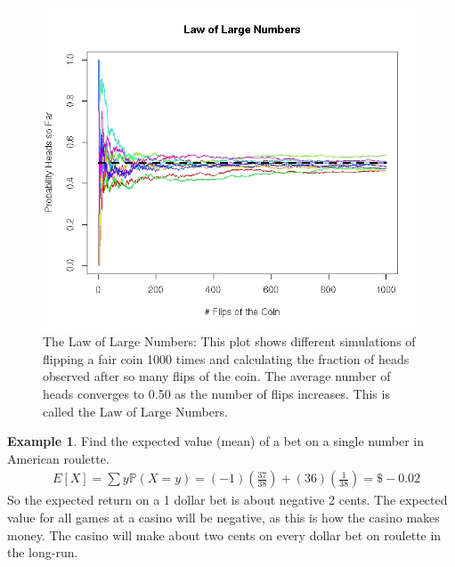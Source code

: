 \documentclass[
]{book}
\newcommand{\prob}[1]{{\mathbb{P}(#1)}}
\theoremstyle{definition}
\theoremstyle{definition}
\newtheorem{example}{Example}[chapter]
\theoremstyle{definition}
\theoremstyle{definition}
\theoremstyle{remark}
\begin{document}
\begin{figure}
\includegraphics[width=0.7\linewidth]{LLN_Plot} \caption{The Law of Large Numbers: This plot shows different simulations of flipping a fair coin 1000 times and calculating the fraction of heads observed after so many flips of the coin. The average number of heads converges to 0.50 as the number of flips increases. This is called the Law of Large Numbers.}\label{fig:addLLNFig}
\end{figure}

\begin{example}
\protect\hypertarget{exm:unnamed-chunk-261}{}\label{exm:unnamed-chunk-261}Find the expected value (mean) of a bet on a single number in American roulette.
\[
\begin{aligned}
& E[X]=\sum y \prob{X=y}= (-1)\left(\frac{37}{38}\right)+(36)\left( \frac{1}{38}\right)=\$-0.02
\end{aligned}
\]
So the expected return on a 1 dollar bet is about negative 2 cents. The expected value for all games at a casino will be negative, as this is how the casino makes money. The casino will make about two cents on every dollar bet on roulette in the long-run.
\end{example}
\end{document}
